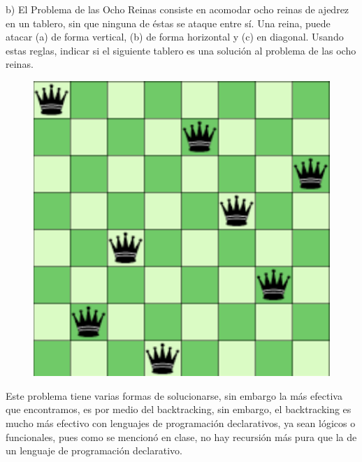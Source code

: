 \Large

b) El Problema de las Ocho Reinas consiste en acomodar ocho reinas de ajedrez en un tablero, sin que ninguna de éstas se ataque entre sí. Una reina, puede atacar (a) de forma vertical, (b) de forma horizontal y (c) en diagonal. Usando estas reglas, indicar si el siguiente tablero es una solución al problema de las ocho reinas.\\

\begin{figure}[h!]
\centering
\includegraphics[scale=0.35]{Tablero.png}
\end{figure}
\large

Este problema tiene varias formas de solucionarse, sin embargo la más efectiva que encontramos, es por medio del backtracking,
sin embargo, el backtracking es mucho más efectivo con lenguajes de programación declarativos, ya sean lógicos o funcionales,
pues como se mencionó en clase, no hay recursión más pura que la de un lenguaje de programación declarativo.

